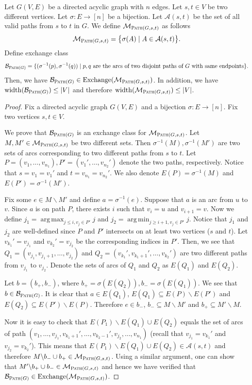 \documentclass{article}
\newcommand{\M}{\mathcal M}
\newcommand{\B}{\mathcal B}
\newcommand{\del}{\backslash}
\DeclareMathOperator{\rank}{width}
\DeclareMathOperator*{\argmax}{arg\,max}
\DeclareMathOperator*{\argmin}{arg\,min}
\DeclareMathOperator{\Exchange}{Exchange}
\newcommand{\Path}{\textsc{Path}\xspace}
\begin{document}
\begin{fact}[Path]
\label{fact:path}
Let $G(V,E)$ be a directed acyclic graph with $n$ edges.
Let $s,t\in V$ be two different vertices.
Let $\sigma\colon E\rightarrow [n]$ be a bijection.
Let $\mathcal A(s,t)$ be the set of all valid paths from $s$ to $t$ in $G$. 
We define $\M_{\Path(G,s,t)}$ as follows
$$
\M_{\Path(G,s,t)} = \big\{\sigma(A) \mid A\in\mathcal A(s,t) \big\}.
$$
Define exchange class
$$
\B_{\Path(G)} = \{(\sigma^{-1}(p), \sigma^{-1}(q)) \mid p,q \text{ are the arcs of two disjoint paths of }G\text{ with same endpoints}\}.
$$
Then, we have $\B_{\Path(G)} \in \Exchange(\M_{\Path(G,s,t)})$. 
In addition, we have $\rank(\B_{\Path(G)}) \le |V|$ and therefore $\rank(\M_{\Path(G,s,t)}) \le |V|$.
\end{fact}

\begin{proof}
Fix  a directed acyclic graph $G(V,E)$ and a bijection $\sigma\colon E\rightarrow [n]$. 
Fix two vertices $s,t\in V$.

We prove that $\B_{\Path(G)}$ is an exchange class for $\M_{\Path(G,s,t)}$.
Let $M,M' \in \M_{\Path(G,s,t)}$ be two different sets. 
Then $\sigma^{-1}(M),\sigma^{-1}(M')$ are two sets of arcs corresponding to two different paths from $s$ to $t$.
Let $P=(v_1,\ldots,v_{n_1}),P'=(v_1',\ldots,v_{n_2}')$ denote the two paths, respectively. 
Notice that $s=v_1=v_1'$ and $t=v_{n_1}=v_{n_2}'$.
We also denote $E(P) = \sigma^{-1}(M)$ and $E(P') = \sigma^{-1}(M')$.


Fix some $e\in M\del M'$ and define $a=\sigma^{-1}(e)$.
Suppose that $a$ is an arc from $u$ to $v$.
Since $a$ is on path $P$, there exists $i$ such that $v_i=u$ and $v_{i+1} = v$.
Now we define $j_1 = \argmax_{j \le i, v_j\in P'} j$ and $j_2 = \argmin_{j \ge i+1, v_j \in P'} j$.
Notice that $j_1$ and $j_2$ are well-defined since $P$ and $P'$ intersects on at least two vertices ($s$ and $t$).
Let $v_{k_1}' = v_{j_1}$ and $v_{k_2}'= v_{j_2}$ be the corresponding indices in $P'$.
Then, we see that $Q_1=(v_{j_1},v_{j_1+1},\ldots,v_{j_2})$ and $Q_2= (v_{k_1}',v_{k_1+1}', \ldots,v_{k_2}')$ are two different paths from $v_{j_1}$ to $v_{j_2}$. 
Denote the sets of arcs of $Q_1$ and $Q_2$ as $E(Q_1)$ and $E(Q_2)$. 

Let $b=(b_+,b_-)$, where $b_+=\sigma(E(Q_2)), b_-=\sigma(E(Q_1))$. We see that $b \in \B_{\Path(G)}$.
It is clear that $a\in E(Q_1)$, $E(Q_1) \subseteq E(P) \del E(P')$ and $E(Q_2) \subseteq E(P') \del E(P)$. 
Therefore $e\in b_-$, $b_-\subseteq M\del M'$ and $b_+\subseteq M'\del M$.

Now it is easy to check that $E(P_1)\del E(Q_1) \cup E(Q_2)$ equals the set of arcs of path $(v_1,\ldots, v_{j_1}, v_{k_1+1}',\ldots, v_{k_2-1}', v_{j_2},\ldots, v_{n_1})$ (recall that $v_{j_1}=v_{k_1}'$ and $v_{j_2}=v_{k_2}'$).
This means that $E(P_1)\del E(Q_1)\cup E(Q_2) \in \mathcal A(s,t)$ and therefore $M\del b_-\cup b_+ \in \M_{\Path(G,s,t)}$.
Using a similar argument, one can show that $M'\del b_+\cup b_- \in \M_{\Path(G,s,t)}$ and hence we have verified that 
$\B_{\Path(G)}\in\Exchange(\M_{\Path(G,s,t)})$.
\end{proof}
\end{document}
